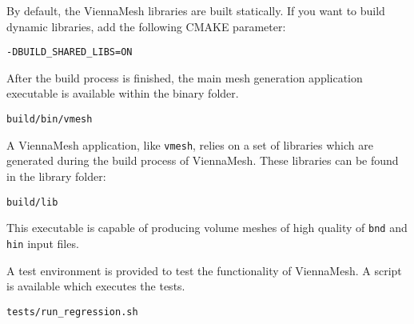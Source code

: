 By default, the ViennaMesh libraries are built statically. If you want to 
build dynamic libraries, add the following CMAKE parameter:
\begin{exaipd}
\begin{Verbatim}
-DBUILD_SHARED_LIBS=ON
\end{Verbatim}
\end{exaipd}


After the build process is finished, the main mesh generation application 
executable is available within the binary folder. 
\begin{exaipd}
\begin{Verbatim}
build/bin/vmesh
\end{Verbatim}
\end{exaipd}

A ViennaMesh application, like \texttt{vmesh}, relies on a set of libraries 
which are generated during the build process of ViennaMesh. These libraries
can be found in the library folder:
\begin{exaipd}
\begin{Verbatim}
build/lib
\end{Verbatim}
\end{exaipd}

This executable is capable of producing volume meshes of high quality of 
\texttt{bnd} and \texttt{hin} input files. 


A test environment is provided to test the functionality of ViennaMesh. 
A script is available which executes the tests.
\begin{exaipd}
\begin{Verbatim}
tests/run_regression.sh
\end{Verbatim}
\end{exaipd}

